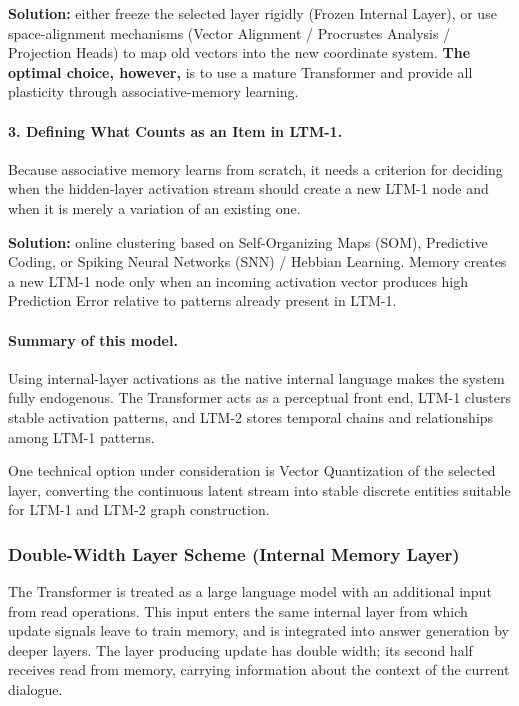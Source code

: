 \documentclass[11pt,a4paper]{article}
\begin{document}
\textbf{Solution:} either freeze the selected layer rigidly (Frozen Internal Layer), or use space-alignment mechanisms (Vector Alignment / Procrustes Analysis / Projection Heads) to map old vectors into the new coordinate system. \textbf{The optimal choice, however,} is to use a mature Transformer and provide all plasticity through associative-memory learning.

\paragraph{3. Defining What Counts as an Item in LTM-1.}
Because associative memory learns from scratch, it needs a criterion for deciding when the hidden-layer activation stream should create a new LTM-1 node and when it is merely a variation of an existing one.

\textbf{Solution:} online clustering based on Self-Organizing Maps (SOM), Predictive Coding, or Spiking Neural Networks (SNN) / Hebbian Learning. Memory creates a new LTM-1 node only when an incoming activation vector produces high Prediction Error relative to patterns already present in LTM-1.

\paragraph{Summary of this model.}
Using internal-layer activations as the native internal language makes the system fully endogenous. The Transformer acts as a perceptual front end, LTM-1 clusters stable activation patterns, and LTM-2 stores temporal chains and relationships among LTM-1 patterns.

One technical option under consideration is Vector Quantization of the selected layer, converting the continuous latent stream into stable discrete entities suitable for LTM-1 and LTM-2 graph construction.

\subsubsection*{Double-Width Layer Scheme (Internal Memory Layer)}
The Transformer is treated as a large language model with an additional input from read operations. This input enters the same internal layer from which update signals leave to train memory, and is integrated into answer generation by deeper layers. The layer producing update has double width; its second half receives read from memory, carrying information about the context of the current dialogue.
\end{document}

